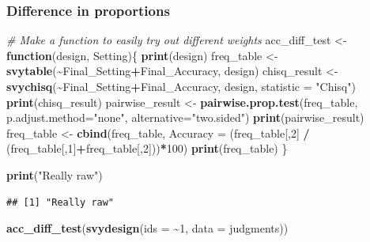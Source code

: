 \documentclass[
]{article}
\newenvironment{Shaded}{\begin{snugshade}}{\end{snugshade}}
\newcommand{\AttributeTok}[1]{\textcolor[rgb]{0.13,0.29,0.53}{#1}}
\newcommand{\CommentTok}[1]{\textcolor[rgb]{0.56,0.35,0.01}{\textit{#1}}}
\newcommand{\ControlFlowTok}[1]{\textcolor[rgb]{0.13,0.29,0.53}{\textbf{#1}}}
\newcommand{\DecValTok}[1]{\textcolor[rgb]{0.00,0.00,0.81}{#1}}
\newcommand{\FunctionTok}[1]{\textcolor[rgb]{0.13,0.29,0.53}{\textbf{#1}}}
\newcommand{\NormalTok}[1]{#1}
\newcommand{\OtherTok}[1]{\textcolor[rgb]{0.56,0.35,0.01}{#1}}
\newcommand{\SpecialCharTok}[1]{\textcolor[rgb]{0.81,0.36,0.00}{\textbf{#1}}}
\newcommand{\StringTok}[1]{\textcolor[rgb]{0.31,0.60,0.02}{#1}}
\begin{document}
\subsubsection{Difference in
proportions}\label{difference-in-proportions}

\begin{Shaded}
\begin{Highlighting}[]
\CommentTok{\# Make a function to easily try out different weights}
\NormalTok{acc\_diff\_test }\OtherTok{\textless{}{-}} \ControlFlowTok{function}\NormalTok{(design, Setting)\{}
  \FunctionTok{print}\NormalTok{(design)}
\NormalTok{  freq\_table }\OtherTok{\textless{}{-}} \FunctionTok{svytable}\NormalTok{(}\SpecialCharTok{\textasciitilde{}}\NormalTok{Final\_Setting}\SpecialCharTok{+}\NormalTok{Final\_Accuracy, design)}
\NormalTok{  chisq\_result }\OtherTok{\textless{}{-}} \FunctionTok{svychisq}\NormalTok{(}\SpecialCharTok{\textasciitilde{}}\NormalTok{Final\_Setting}\SpecialCharTok{+}\NormalTok{Final\_Accuracy, design, }\AttributeTok{statistic =} \StringTok{"Chisq"}\NormalTok{)}
  \FunctionTok{print}\NormalTok{(chisq\_result)}
\NormalTok{  pairwise\_result }\OtherTok{\textless{}{-}} \FunctionTok{pairwise.prop.test}\NormalTok{(freq\_table, }\AttributeTok{p.adjust.method=}\StringTok{"none"}\NormalTok{, }\AttributeTok{alternative=}\StringTok{"two.sided"}\NormalTok{)}
  \FunctionTok{print}\NormalTok{(pairwise\_result)}
\NormalTok{  freq\_table }\OtherTok{\textless{}{-}} \FunctionTok{cbind}\NormalTok{(freq\_table, }\AttributeTok{Accuracy =}\NormalTok{ (freq\_table[,}\DecValTok{2}\NormalTok{] }\SpecialCharTok{/}\NormalTok{ (freq\_table[,}\DecValTok{1}\NormalTok{]}\SpecialCharTok{+}\NormalTok{freq\_table[,}\DecValTok{2}\NormalTok{]))}\SpecialCharTok{*}\DecValTok{100}\NormalTok{)}
  \FunctionTok{print}\NormalTok{(freq\_table)}
\NormalTok{\}}

\FunctionTok{print}\NormalTok{(}\StringTok{"Really raw"}\NormalTok{)}
\end{Highlighting}
\end{Shaded}

\begin{verbatim}
## [1] "Really raw"
\end{verbatim}

\begin{Shaded}
\begin{Highlighting}[]
\FunctionTok{acc\_diff\_test}\NormalTok{(}\FunctionTok{svydesign}\NormalTok{(}\AttributeTok{ids =} \SpecialCharTok{\textasciitilde{}}\DecValTok{1}\NormalTok{, }\AttributeTok{data =}\NormalTok{ judgments))}
\end{Highlighting}
\end{Shaded}
\end{document}
